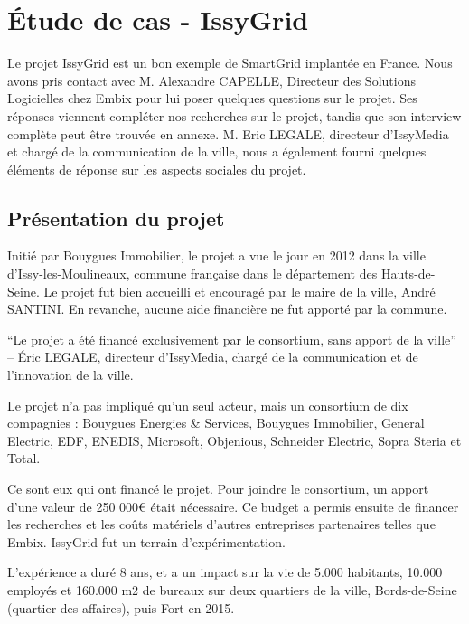 \section{Étude de cas - IssyGrid}

Le projet IssyGrid est un bon exemple de SmartGrid implantée en France.
Nous avons pris contact avec M. Alexandre CAPELLE, Directeur des Solutions Logicielles chez Embix pour
lui poser quelques questions sur le projet.
Ses réponses viennent compléter nos recherches sur le projet, tandis que son interview complète peut être
trouvée en annexe.
M. Eric LEGALE, directeur d’IssyMedia et chargé de la communication de la ville,
nous a également fourni quelques éléments de réponse sur les aspects sociales du projet.

\subsection{Présentation du projet}
Initié par Bouygues Immobilier, le projet a vue le jour en 2012 dans la ville d'Issy-les-Moulineaux,
commune française dans le département des Hauts-de-Seine.
Le projet fut bien accueilli et encouragé par le maire de la ville, André SANTINI.
En revanche, aucune aide financière ne fut apporté par la commune.

``Le projet a été financé exclusivement par le consortium, sans apport de la ville''
--  Éric LEGALE, directeur d’IssyMedia, chargé de la communication et
de l’innovation de la ville.

Le projet n'a pas impliqué qu'un seul acteur, mais un consortium de dix compagnies :
Bouygues Energies \& Services, Bouygues Immobilier, General Electric, EDF, ENEDIS, Microsoft,
Objenious, Schneider Electric, Sopra Steria et Total.

Ce sont eux qui ont financé le projet.
Pour joindre le consortium, un apport d'une valeur de 250 000€ était nécessaire.
Ce budget a permis ensuite de financer les recherches et les coûts matériels d'autres entreprises partenaires telles que Embix.
IssyGrid fut un terrain d'expérimentation.

L'expérience a duré 8 ans, et a un impact sur la vie de 5.000 habitants, 10.000 employés
et 160.000 m2 de bureaux sur deux quartiers de la ville, Bords-de-Seine (quartier des affaires),
puis Fort en 2015.

